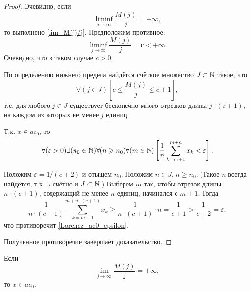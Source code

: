 \begin{proof}
Очевидно, если
\begin{equation}
	\liminf_{j \to \infty} \frac{M(j)}{j} = +\infty
	,
\end{equation}
то выполнено \eqref{lim_M(j)/j}.
Предположим противное:
\begin{equation}
	\liminf_{j \to \infty} \frac{M(j)}{j} = с < +\infty
	.
\end{equation}
Очевидно, что в таком случае $c>0$.

По определению нижнего предела найдётся счётное множество
$J\subset\N$ такое, что
\begin{equation}
	\forall(j\in J)\left[c \leq \frac{M(j)}{j} \leq c+1 \right],
\end{equation}
т.е. для любого $j\in J$ существует бесконечно много отрезков длины $j\cdot(c+1)$,
на каждом из которых не менее $j$ единиц.

Т.к. $x\in ac_0$, то
\begin{equation}\label{Lorencz_ac0_epsilon}
	\forall(\varepsilon>0)
	\exists(n_0\in\N)
	\forall(n \geq n_0)
	\forall(m\in\N)
	\left[
		\frac{1}{n} \sum_{k=m+1}^{m+n}x_k < \varepsilon
	\right]
	.
\end{equation}

Положим $\varepsilon = 1/(c+2)$ и отыщем $n_0$.
Положим $n\in J$, $n\geq n_0$.
(Такое $n$ всегда найдётся, т.к. $J$ счётно и $J\subset\N$.)
Выберем $m$ так, чтобы отрезок длины $n\cdot(c+1)$,
содержащий не менее $n$ единиц,
начинался с $m+1$.
Тогда
\begin{equation}
	\frac{1}{n\cdot(c+1)}\sum_{k=m+1}^{m+n\cdot(c+1)}x_k
	\geq
	\frac{1}{n\cdot(c+1)} \cdot n
	=
	\frac{1}{c+1}
	>
	\frac{1}{c+2}
	=
	\varepsilon,
\end{equation}
что противоречит \eqref{Lorencz_ac0_epsilon}.

Полученное противоречие завершает доказательство.
\end{proof}

\begin{lemma}
	\label{thm:lim_M(j)/j_dost}
	Если
	\begin{equation}\label{lim_M(j)/j_dost}
		\lim_{j \to \infty} \frac{M(j)}{j} = +\infty
		,
	\end{equation}
	то $x \in ac_0$.
\end{lemma}

